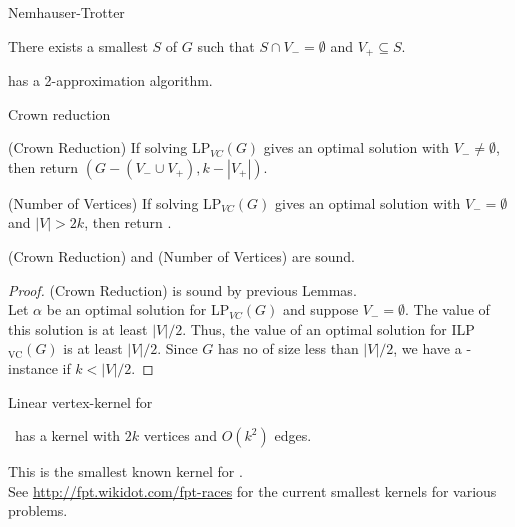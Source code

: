 \begin{frame}{Nemhauser-Trotter}

 \begin{corollary}
  There exists a smallest \vc $S$ of $G$ such that $S\cap V_- = \emptyset$ and $V_+ \subseteq S$.
 \end{corollary}

\begin{corollary}
	\VC has a 2-approximation algorithm.
\end{corollary}

\end{frame}



\begin{frame}{Crown reduction}
 \begin{block}{(Crown Reduction)}
  If solving LP$_{VC}(G)$ gives an optimal solution with $V_-\ne \emptyset$, then return $(G- (V_-\cup V_+), k-|V_+|)$.
 \end{block}
 
 \pause
 \begin{block}{(Number of Vertices)}
  If solving LP$_{VC}(G)$ gives an optimal solution with $V_- = \emptyset$ and $|V|>2k$, then return \No.
 \end{block}

 \pause
 \begin{lemma}
  (Crown Reduction) and (Number of Vertices) are sound.
 \end{lemma}
 \begin{proof}
  (Crown Reduction) is sound by previous Lemmas.\\
  Let $\alpha$ be an optimal solution for LP$_{VC}(G)$ and suppose $V_- = \emptyset$. The value of this solution is at least $|V|/2$.
  Thus, the value of an optimal solution for ILP$_{\text{VC}}(G)$ is at least $|V|/2$.
  Since $G$ has no \vc of size less than $|V|/2$, we have a \No-instance if $k<|V|/2$.
 \end{proof}

\end{frame}


\begin{frame}{Linear vertex-kernel for \VC}

 \begin{theorem}
  \VC\ has a kernel with $2k$ vertices and $O(k^2)$ edges.
 \end{theorem}
 
 This is the smallest known kernel for \VC.\\
 See \url{http://fpt.wikidot.com/fpt-races} for the current smallest kernels for various problems.

\end{frame}



